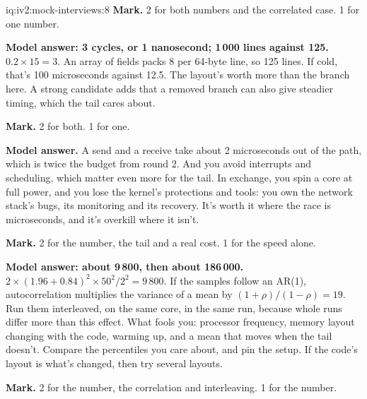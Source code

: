 \begin{solution}{iq:iv2:mock-interviews:8}
\textbf{Mark.} 2 for both numbers and the correlated case. 1 for one number.

\ivstop
\textbf{Model answer: 3 cycles, or 1 nanosecond; 1\,000 lines against 125.} $0.2 \times 15 = 3$. An array of fields packs 8 per 64-byte line, so 125 lines. If cold, that's 100 microseconds against 12.5. The layout's worth more than the branch here. A strong candidate adds that a removed branch can also give steadier timing, which the tail cares about.

\textbf{Mark.} 2 for both. 1 for one.

\ivstop
\textbf{Model answer.} A send and a receive take about 2 microseconds out of the path, which is twice the budget from round 2. And you avoid interrupts and scheduling, which matter even more for the tail. In exchange, you spin a core at full power, and you lose the kernel's protections and tools: you own the network stack's bugs, its monitoring and its recovery. It's worth it where the race is microseconds, and it's overkill where it isn't.

\textbf{Mark.} 2 for the number, the tail and a real cost. 1 for the speed alone.

\ivstop
\textbf{Model answer: about 9\,800, then about 186\,000.} $2 \times (1.96 + 0.84)^2 \times 50^2/2^2 = 9\,800$. If the samples follow an AR(1), autocorrelation multiplies the variance of a mean by $(1 + \rho)/(1 - \rho) = 19$. Run them interleaved, on the same core, in the same run, because whole runs differ more than this effect. What fools you: processor frequency, memory layout changing with the code, warming up, and a mean that moves when the tail doesn't. Compare the percentiles you care about, and pin the setup. If the code's layout is what's changed, then try several layouts.

\textbf{Mark.} 2 for the number, the correlation and interleaving. 1 for the number.


\end{solution}

